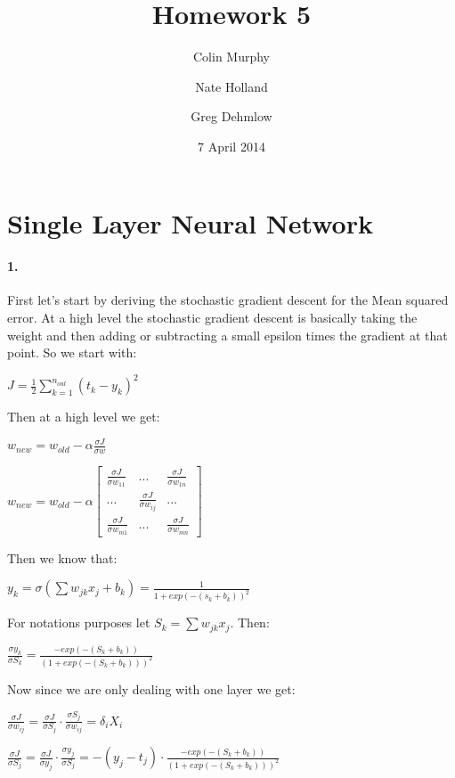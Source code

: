 \documentclass[12pt]{article}
\title{Homework 5}
\date{7 April 2014}
\author{Colin Murphy\\
\and
Nate Holland\\ 
\and
Greg Dehmlow
}
\begin{document}
\vspace{-5em}
\maketitle

\section*{Single Layer Neural Network}

\paragraph{1.}

First let's start by deriving the stochastic gradient descent for the Mean squared error.
At a high level the stochastic gradient descent is basically taking the weight and then adding or subtracting a small epsilon times the gradient at that point. So we start with:

$J = \frac{1}{2}\sum\limits_{k=1}^{n_{out}} (t_k - y_k)^2
$

Then at a high level we get:

$w_{new} = w_{old} - \alpha\frac{\sigma J }{\sigma w}$

$w_{new} = w_{old} - \alpha \left[ \begin{array}{ccc}
\frac{\sigma J}{\sigma w_{11}} & ... & \frac{\sigma J}{\sigma w_{1n}}\\
... & \frac{\sigma J}{\sigma w_{ij}} & ... \\
\frac{\sigma J}{\sigma w_{m1}} & ... & \frac{\sigma J}{\sigma w_{mn}} \end{array} \right]$

Then we know that:

$y_k = \sigma(\sum w_{jk}x_j + b_k) = \frac{1}{1 + exp(-(s_k + b_k))^2}$

For notations purposes let $S_k =  \sum w_{jk}x_j$. Then:

$\frac{\sigma y_k}{\sigma S_k} =
\frac{-exp(-(S_k + b_k))}{(1 + exp(-(S_k + b_k)))^2}$

Now since we are only dealing with one layer we get:

$\frac{\sigma J}{\sigma w_{ij}} = 
\frac{\sigma J}{\sigma S_j} \cdot \frac{\sigma S_j}{\sigma w_{ij}}
= \delta_i X_i$

$\frac{\sigma J}{\sigma S_j} = 
\frac{\sigma J}{\sigma y_j} \cdot \frac{\sigma y_j}{\sigma S_j}
= -(y_j - t_j) \cdot \frac{-exp(-(S_k + b_k))}{(1 + exp(-(S_k + b_k)))^2}
$ 
\end{document}
